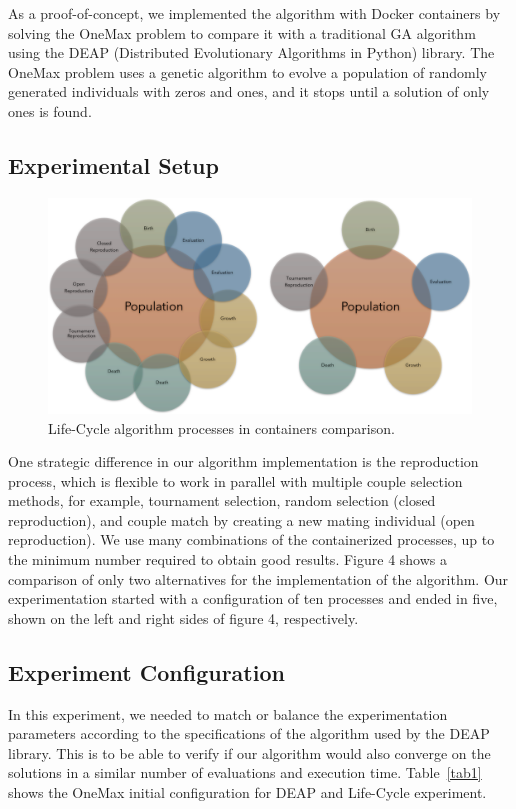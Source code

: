 \documentclass[runningheads]{llncs}
\begin{document}
As a proof-of-concept, we implemented the algorithm with Docker containers by
solving the OneMax problem to compare it with a traditional GA algorithm using
the DEAP (Distributed Evolutionary Algorithms in Python) library. The OneMax
problem uses a genetic algorithm to evolve a population of randomly generated
individuals with zeros and ones, and it stops until a solution of only ones is
found.

\subsection{Experimental Setup}

\begin{figure}
    \includegraphics[width=\textwidth]{img/fig5_processes_containers.pdf}
    \caption{Life-Cycle algorithm processes in containers comparison.} \label{fig5}
    \end{figure}

One strategic difference in our algorithm implementation is the reproduction
process, which is flexible to work in parallel with multiple couple selection
methods, for example, tournament selection, random selection (closed
reproduction), and couple match by creating a new mating individual (open
reproduction). We use many combinations of the containerized processes, up to
the minimum number required to obtain good results. Figure 4 shows a comparison
of only two alternatives for the implementation of the algorithm. Our
experimentation started with a configuration of ten processes and ended in
five, shown on the left and right sides of figure 4, respectively.

\subsection{Experiment Configuration}

In this experiment, we needed to match or balance the experimentation
parameters according to the specifications of the algorithm used by the DEAP
library. This is to be able to verify if our algorithm would also converge on
the solutions in a similar number of evaluations and execution time.
Table~\ref{tab1} shows the OneMax initial configuration for DEAP and Life-Cycle
experiment.
\end{document}
